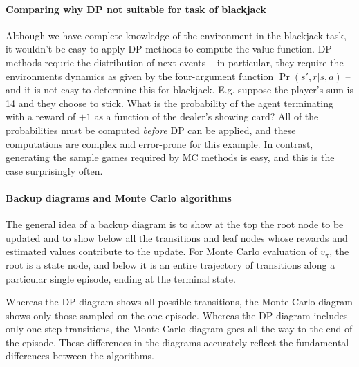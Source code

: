 \documentclass[12pt]{article}
\begin{document}
\paragraph{Comparing why DP not suitable for task of blackjack} Although we have complete knowledge of the environment in the blackjack task, it wouldn't be easy to apply DP methods to compute the value function. DP methods requrie the distribution of next events -- in particular, they require the environments dynamics as given by the four-argument function $\Pr(s', r | s, a)$ -- and it is not easy to determine this for blackjack. E.g. suppose the player's sum is 14 and they choose to stick. What is the probability of the agent terminating with a reward of $+1$ as a function of the dealer's showing card? All of the probabilities must be computed \emph{before} DP can be applied, and these computations are complex and error-prone for this example. In contrast, generating the sample games required by MC methods is easy, and this is the case surprisingly often.

\paragraph{Backup diagrams and Monte Carlo algorithms} The general idea of a backup diagram is to show at the top the root node to be updated and to show below all the transitions and leaf nodes whose rewards and estimated values contribute to the update. For Monte Carlo evaluation of $v_\pi$, the root is a state node, and below it is an entire trajectory of transitions along a particular single episode, ending at the terminal state.

\begin{figure}[h]
  \centering
\end{figure}

Whereas the DP diagram shows all possible transitions, the Monte Carlo diagram shows only those sampled on the one episode. Whereas the DP diagram includes only one-step transitions, the Monte Carlo diagram goes all the way to the end of the episode. These differences in the diagrams accurately reflect the fundamental differences between the algorithms.
\end{document}
